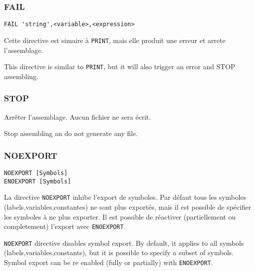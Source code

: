 \subsubsection{FAIL}

\begin{verbatim}
FAIL 'string',<variable>,<expression>
\end{verbatim}

\begin{xfr}
Cette directive est simaire à \texttt{PRINT}, mais elle produit une erreur et arrete l'assemblage.
\end{xfr}

\begin{xen}
This directive is similar to \texttt{PRINT}, but it will also trigger an error and STOP assembling.
\end{xen}

\subsubsection{STOP}

\begin{xfr}
Arrêter l'assemblage. Aucun fichier ne sera écrit.
\end{xfr}

\begin{xen}
Stop assembling an do not generate any file.
\end{xen}

\subsubsection{NOEXPORT}

\begin{verbatim}
NOEXPORT [Symbols]
ENOEXPORT [Symbols]
\end{verbatim}

\begin{xfr}
La directive \texttt{NOEXPORT} inhibe l'export de symboles.
Par défaut tous les symboles (labels,variables,constantes) ne sont plus exportés, mais il est possible de spécifier les symboles à ne plus exporter.
Il est possible de réactiver (partiellement ou completement) l'export avec \texttt{ENOEXPORT}.
\end{xfr}

\begin{xen}
\texttt{NOEXPORT} directive disables symbol export.
By default, it applies to all symbols (labels,variables,constants), but it is possible to specify a subset of symbols.
Symbol export can be re enabled (fully or partially) with \texttt{ENOEXPORT}.
\end{xen}


